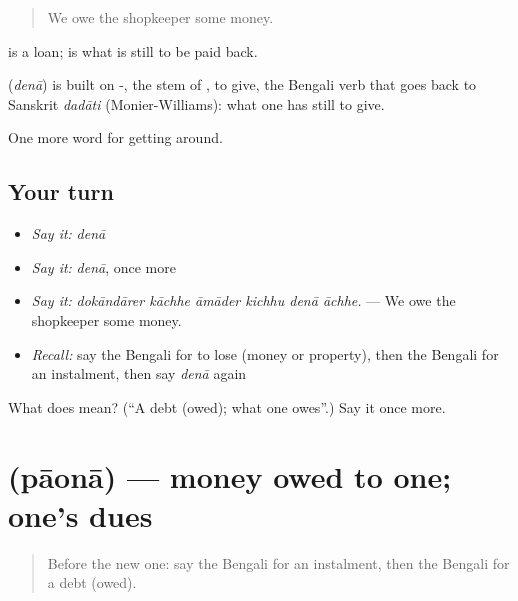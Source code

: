\begin{quote}
We owe the shopkeeper some money.
\end{quote}

 is a loan;  is what is still to be paid back.

\begin{cousinweb}
\textbf{} (\emph{denā}) is built on -, the stem of , to give, the Bengali verb that goes back to Sanskrit \emph{dadāti} (Monier-Williams): what one has still to give.
\end{cousinweb}

\begin{grammarlens}[title={What you've built}]
One more word for getting around.
\end{grammarlens}

\subsection*{Your turn}
\begin{itemize}
\raggedright
  \item \emph{Say it:} \emph{denā}
  \item \emph{Say it:} \emph{denā}, once more
  \item \emph{Say it:} \emph{dokāndārer kāchhe āmāder kichhu denā āchhe.} — We owe the shopkeeper some money.
  \item \emph{Recall:} say the Bengali for to lose (money or property), then the Bengali for an instalment, then say \emph{denā} again
\end{itemize}

\begin{tcolorbox}[breakable,colback=teal!4,colframe=teal!35!black,title={Before you move on}]
What does  mean? (\textquotedblleft{}A debt (owed); what one owes\textquotedblright{}.) Say it once more.
\end{tcolorbox}
\section[\texorpdfstring{\bn{পাওনা} (pāonā)}{পাওনা (pāonā)}]{ (pāonā) — money owed to one; one's dues}

\label{lesson:BN-C416-paona}



\begin{quote}
Before the new one: say the Bengali for an instalment, then the Bengali for a debt (owed).
\end{quote}

